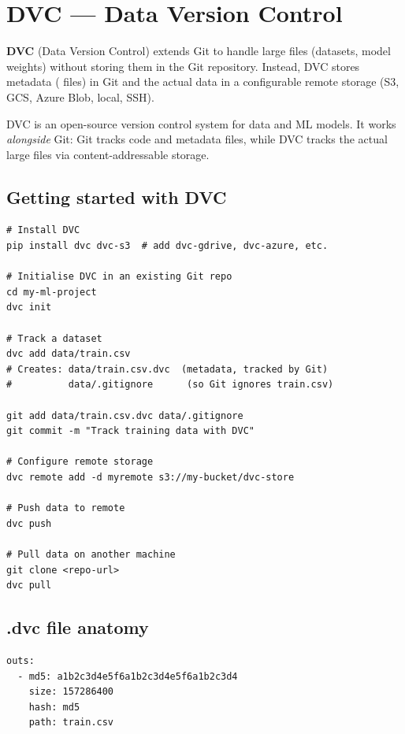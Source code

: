 \section{DVC --- Data Version Control}
\label{sec:dvc}

\textbf{DVC} (Data Version Control) extends Git to handle large
files (datasets, model weights) without storing them in the Git repository.
Instead, DVC stores metadata ( files) in Git and the actual data
in a configurable remote storage (S3, GCS, Azure Blob, local, SSH).

\begin{definition}[DVC]
DVC is an open-source version control system for data and ML models.
It works \emph{alongside} Git: Git tracks code and  metadata
files, while DVC tracks the actual large files via content-addressable
storage.
\end{definition}

\subsection{Getting started with DVC}

\begin{codeblock}[title=\textbf{DVC initialisation and basic usage}]
\begin{verbatim}
# Install DVC
pip install dvc dvc-s3  # add dvc-gdrive, dvc-azure, etc.

# Initialise DVC in an existing Git repo
cd my-ml-project
dvc init

# Track a dataset
dvc add data/train.csv
# Creates: data/train.csv.dvc  (metadata, tracked by Git)
#          data/.gitignore      (so Git ignores train.csv)

git add data/train.csv.dvc data/.gitignore
git commit -m "Track training data with DVC"

# Configure remote storage
dvc remote add -d myremote s3://my-bucket/dvc-store

# Push data to remote
dvc push

# Pull data on another machine
git clone <repo-url>
dvc pull
\end{verbatim}
\end{codeblock}

\subsection{.dvc file anatomy}

\begin{codeblock}[title=\textbf{data/train.csv.dvc}]
\begin{verbatim}
outs:
  - md5: a1b2c3d4e5f6a1b2c3d4e5f6a1b2c3d4
    size: 157286400
    hash: md5
    path: train.csv
\end{verbatim}
\end{codeblock}

